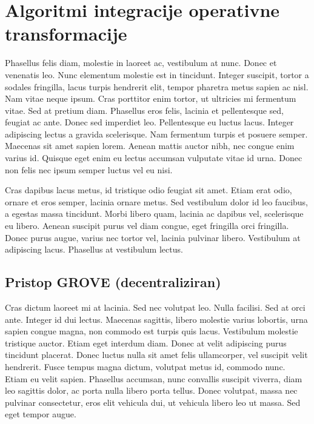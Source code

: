 \documentclass[a4paper, 12pt, twoside]{book}
\begin{document}
\chapter{Algoritmi integracije operativne transformacije}

Phasellus felis diam, molestie in laoreet ac, vestibulum at nunc. Donec et venenatis leo. Nunc elementum molestie est in tincidunt. Integer suscipit, tortor a sodales fringilla, lacus turpis hendrerit elit, tempor pharetra metus sapien ac nisl. Nam vitae neque ipsum. Cras porttitor enim tortor, ut ultricies mi fermentum vitae. Sed at pretium diam. Phasellus eros felis, lacinia et pellentesque sed, feugiat ac ante. Donec sed imperdiet leo. Pellentesque eu luctus lacus. Integer adipiscing lectus a gravida scelerisque. Nam fermentum turpis et posuere semper. Maecenas sit amet sapien lorem. Aenean mattis auctor nibh, nec congue enim varius id. Quisque eget enim eu lectus accumsan vulputate vitae id urna. Donec non felis nec ipsum semper luctus vel eu nisi.

Cras dapibus lacus metus, id tristique odio feugiat sit amet. Etiam erat odio, ornare et eros semper, lacinia ornare metus. Sed vestibulum dolor id leo faucibus, a egestas massa tincidunt. Morbi libero quam, lacinia ac dapibus vel, scelerisque eu libero. Aenean suscipit purus vel diam congue, eget fringilla orci fringilla. Donec purus augue, varius nec tortor vel, lacinia pulvinar libero. Vestibulum at adipiscing lacus. Phasellus at vestibulum lectus.

\section{Pristop GROVE (decentraliziran)}

Cras dictum laoreet mi at lacinia. Sed nec volutpat leo. Nulla facilisi. Sed at orci ante. Integer id dui lectus. Maecenas sagittis, libero molestie varius lobortis, urna sapien congue magna, non commodo est turpis quis lacus. Vestibulum molestie tristique auctor. Etiam eget interdum diam. Donec at velit adipiscing purus tincidunt placerat. Donec luctus nulla sit amet felis ullamcorper, vel suscipit velit hendrerit. Fusce tempus magna dictum, volutpat metus id, commodo nunc. Etiam eu velit sapien. Phasellus accumsan, nunc convallis suscipit viverra, diam leo sagittis dolor, ac porta nulla libero porta tellus. Donec volutpat, massa nec pulvinar consectetur, eros elit vehicula dui, ut vehicula libero leo ut massa. Sed eget tempor augue.
\end{document}

